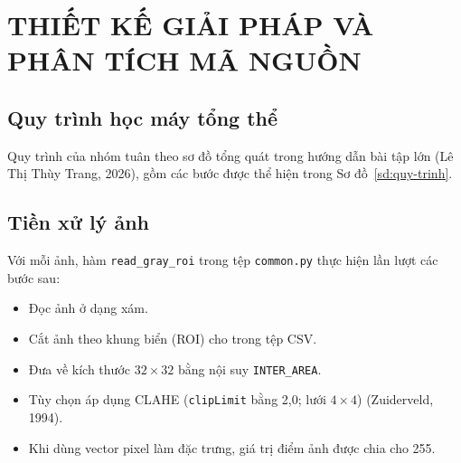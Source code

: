 \chapter{THIẾT KẾ GIẢI PHÁP VÀ PHÂN TÍCH MÃ NGUỒN}

\section{Quy trình học máy tổng thể}

Quy trình của nhóm tuân theo sơ đồ tổng quát trong hướng dẫn bài tập lớn (Lê Thị Thùy Trang, 2026), gồm các bước được thể hiện trong Sơ đồ~\ref{sd:quy-trinh}.

\begin{sodo}[H]
    \centering
    \label{sd:quy-trinh}
\end{sodo}

\section{Tiền xử lý ảnh}

Với mỗi ảnh, hàm \texttt{read\_gray\_roi} trong tệp \texttt{common.py} thực hiện lần lượt các bước sau:

\begin{itemize}
    \item Đọc ảnh ở dạng xám.
    \item Cắt ảnh theo khung biển (ROI) cho trong tệp CSV.
    \item Đưa về kích thước $32\times32$ bằng nội suy \texttt{INTER\_AREA}.
    \item Tùy chọn áp dụng CLAHE (\texttt{clipLimit} bằng 2,0; lưới $4\times4$) (Zuiderveld, 1994).
    \item Khi dùng vector pixel làm đặc trưng, giá trị điểm ảnh được chia cho 255.
\end{itemize}

